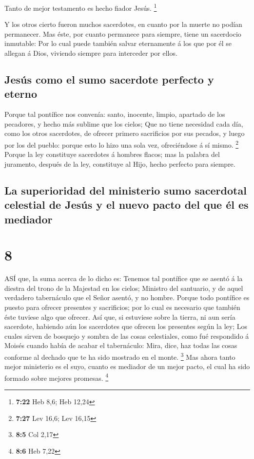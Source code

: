  Tanto de mejor testamento es hecho fiador Jesús.
\footnote{\textbf{7:22} Heb 8,6; Heb 12,24}

 Y los otros cierto fueron muchos sacerdotes, en cuanto por
la muerte no podían permanecer.  Mas éste, por cuanto
permanece para siempre, tiene un sacerdocio inmutable:  Por
lo cual puede también salvar eternamente á los que por él se allegan á
Dios, viviendo siempre para interceder por ellos.

\hypertarget{jesuxfas-como-el-sumo-sacerdote-perfecto-y-eterno}{%
\subsection{Jesús como el sumo sacerdote perfecto y
eterno}\label{jesuxfas-como-el-sumo-sacerdote-perfecto-y-eterno}}

 Porque tal pontífice nos convenía: santo, inocente,
limpio, apartado de los pecadores, y hecho más sublime que los cielos;
 Que no tiene necesidad cada día, como los otros
sacerdotes, de ofrecer primero sacrificios por sus pecados, y luego por
los del pueblo: porque esto lo hizo una sola vez, ofreciéndose á sí
mismo. \footnote{\textbf{7:27} Lev 16,6; Lev 16,15}  Porque
la ley constituye sacerdotes á hombres flacos; mas la palabra del
juramento, después de la ley, constituye al Hijo, hecho perfecto para
siempre.

\hypertarget{la-superioridad-del-ministerio-sumo-sacerdotal-celestial-de-jesuxfas-y-el-nuevo-pacto-del-que-uxe9l-es-mediador}{%
\subsection{La superioridad del ministerio sumo sacerdotal celestial de
Jesús y el nuevo pacto del que él es
mediador}\label{la-superioridad-del-ministerio-sumo-sacerdotal-celestial-de-jesuxfas-y-el-nuevo-pacto-del-que-uxe9l-es-mediador}}

\hypertarget{section-7}{%
\section{8}\label{section-7}}

 ASÍ que, la suma acerca de lo dicho es: Tenemos tal
pontífice que se asentó á la diestra del trono de la Majestad en los
cielos;  Ministro del santuario, y de aquel verdadero
tabernáculo que el Señor asentó, y no hombre.  Porque todo
pontífice es puesto para ofrecer presentes y sacrificios; por lo cual es
necesario que también éste tuviese algo que ofrecer.  Así
que, si estuviese sobre la tierra, ni aun sería sacerdote, habiendo aún
los sacerdotes que ofrecen los presentes según la ley;  Los
cuales sirven de bosquejo y sombra de las cosas celestiales, como fué
respondido á Moisés cuando había de acabar el tabernáculo: Mira, dice,
haz todas las cosas conforme al dechado que te ha sido mostrado en el
monte. \footnote{\textbf{8:5} Col 2,17}  Mas ahora tanto
mejor ministerio es el suyo, cuanto es mediador de un mejor pacto, el
cual ha sido formado sobre mejores promesas. \footnote{\textbf{8:6} Heb
  7,22}

